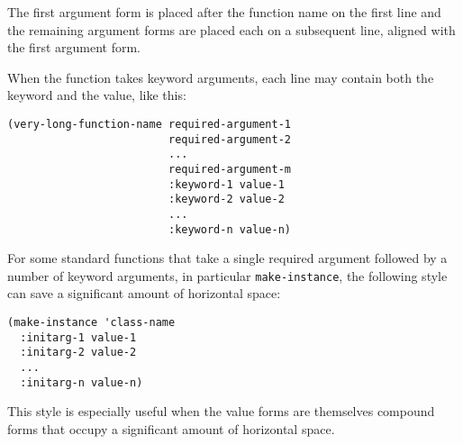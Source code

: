 The first argument form is placed after the function name on the first
line and the remaining argument forms are placed each on a subsequent
line, aligned with the first argument form.

When the function takes keyword arguments, each line may contain both
the keyword and the value, like this:

\begin{verbatim}
(very-long-function-name required-argument-1
                         required-argument-2
                         ...
                         required-argument-m
                         :keyword-1 value-1
                         :keyword-2 value-2
                         ...
                         :keyword-n value-n)
\end{verbatim}

For some standard functions that take a single required argument
followed by a number of keyword arguments, in particular
\texttt{make-instance}, the following style can save a significant
amount of horizontal space:

\begin{verbatim}
(make-instance 'class-name
  :initarg-1 value-1
  :initarg-2 value-2
  ...
  :initarg-n value-n)
\end{verbatim}

This style is especially useful when the value forms are themselves
compound forms that occupy a significant amount of horizontal space.
